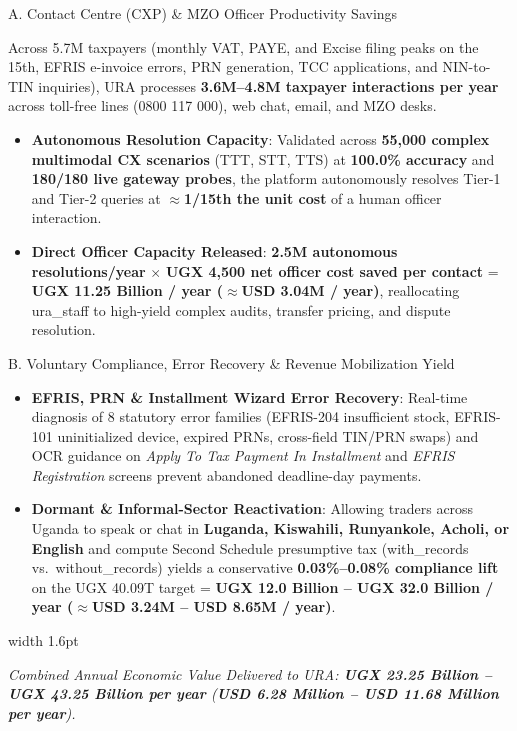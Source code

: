 \documentclass[10pt,a4paper]{article}
\newcommand{\SubHead}[1]{%
  \needspace{12mm}\vspace{1.4mm}%
  {\subheadfont\fontsize{9.0}{10.8}\selectfont\textcolor{inkii}{#1}\par}
  \vspace{0.8mm}\par\nointerlineskip}
\newcommand{\code}[1]{{\datafont\fontsize{8.2}{9}\selectfont\textcolor{inkii}{#1}}}
\newcommand{\pullquote}[1]{%
  \par\vspace{1.0mm}%
  \noindent\begin{minipage}{\linewidth}%
  \hspace*{0mm}\textcolor{slate}{\vrule width 1.6pt}\hspace{3mm}%
  \begin{minipage}{\dimexpr\linewidth-5mm\relax}\itshape\color{inkii}#1\end{minipage}%
  \end{minipage}\par\vspace{1.0mm}}
\begin{document}
\SubHead{A. Contact Centre (CXP) \& MZO Officer Productivity Savings}
Across 5.7M taxpayers (monthly VAT, PAYE, and Excise filing peaks on the 15th, EFRIS e-invoice errors, PRN generation, TCC applications, and NIN-to-TIN inquiries), URA processes \textbf{3.6M--4.8M taxpayer interactions per year} across toll-free lines (\code{0800 117 000}), web chat, email, and MZO desks.
\begin{itemize}[leftmargin=4.5mm,itemsep=0.3mm,topsep=0.3mm]
  \item \textbf{Autonomous Resolution Capacity}: Validated across \textbf{55,000 complex multimodal CX scenarios} (\code{TTT}, \code{STT}, \code{TTS}) at \textbf{100.0\% accuracy} and \textbf{180/180 live gateway probes}, the platform autonomously resolves Tier-1 and Tier-2 queries at \ensuremath{\approx}\textbf{1/15th the unit cost} of a human officer interaction.
  \item \textbf{Direct Officer Capacity Released}: \textbf{2.5M autonomous resolutions/year} $\times$ \textbf{UGX 4,500 net officer cost saved per contact} = \textbf{UGX 11.25 Billion / year (\ensuremath{\approx}USD 3.04M / year)}, reallocating \code{ura\_staff} to high-yield complex audits, transfer pricing, and dispute resolution.
\end{itemize}

\SubHead{B. Voluntary Compliance, Error Recovery \& Revenue Mobilization Yield}
\begin{itemize}[leftmargin=4.5mm,itemsep=0.3mm,topsep=0.3mm]
  \item \textbf{EFRIS, PRN \& Installment Wizard Error Recovery}: Real-time diagnosis of 8 statutory error families (\code{EFRIS-204} insufficient stock, \code{EFRIS-101} uninitialized device, expired PRNs, cross-field TIN/PRN swaps) and OCR guidance on \emph{Apply To Tax Payment In Installment} and \emph{EFRIS Registration} screens prevent abandoned deadline-day payments.
  \item \textbf{Dormant \& Informal-Sector Reactivation}: Allowing traders across Uganda to speak or chat in \textbf{Luganda, Kiswahili, Runyankole, Acholi, or English} and compute Second Schedule presumptive tax (\code{with\_records} vs.\ \code{without\_records}) yields a conservative \textbf{0.03\%--0.08\% compliance lift} on the UGX 40.09T target = \textbf{UGX 12.0 Billion -- UGX 32.0 Billion / year (\ensuremath{\approx}USD 3.24M -- USD 8.65M / year)}.
\end{itemize}

\pullquote{Combined Annual Economic Value Delivered to URA: \textbf{UGX 23.25 Billion -- UGX 43.25 Billion per year} (\textbf{USD 6.28 Million -- USD 11.68 Million per year}).}
\end{document}
